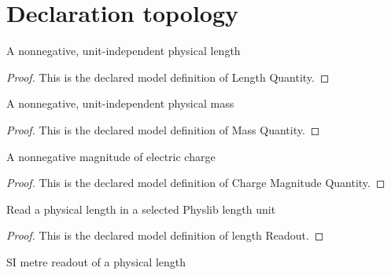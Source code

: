 \section{Declaration topology}
\begin{definition}
  \label{def:physics:phyx-mini-0635:phyxminiproblems-problemphyxmini0635-lengthquantity}
  A nonnegative, unit-independent physical length
\end{definition}
\begin{proof}
  This is the declared model definition of Length Quantity.
\end{proof}
\begin{definition}
  \label{def:physics:phyx-mini-0635:phyxminiproblems-problemphyxmini0635-massquantity}
  A nonnegative, unit-independent physical mass
\end{definition}
\begin{proof}
  This is the declared model definition of Mass Quantity.
\end{proof}
\begin{definition}
  \label{def:physics:phyx-mini-0635:phyxminiproblems-problemphyxmini0635-chargemagnitudequantity}
  A nonnegative magnitude of electric charge
\end{definition}
\begin{proof}
  This is the declared model definition of Charge Magnitude Quantity.
\end{proof}
\begin{definition}
  \label{def:physics:phyx-mini-0635:phyxminiproblems-problemphyxmini0635-lengthreadout}
  Read a physical length in a selected Physlib length unit
\end{definition}
\begin{proof}
  This is the declared model definition of length Readout.
\end{proof}
\begin{definition}
  \label{def:physics:phyx-mini-0635:phyxminiproblems-problemphyxmini0635-lengthinmeters}
  SI metre readout of a physical length
\end{definition}
